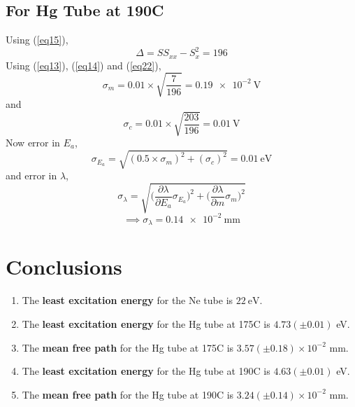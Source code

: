 \documentclass[%
 reprint,
 amsmath,amssymb,
 aps,
]{revtex4-2}
\begin{document}
    \subsection{For Hg Tube at 190\degree C}
        \noindent
        Using (\ref{eq15}),
        \begin{equation}
        \label{eq22}
            \Delta = S S_{xx} - S_{x}^2 = 196
        \end{equation}
        Using (\ref{eq13}), (\ref{eq14}) and (\ref{eq22}), 
        \begin{equation}
        \label{eq23}
            \sigma_m = 0.01 \times \sqrt{\dfrac{7}{196}} = \SI{0.19e-2}{\volt} 
        \end{equation}
        and
        \begin{equation}
        \label{eq24}
            \sigma_c = 0.01 \times \sqrt{\dfrac{203}{196}} = \SI{0.01}{\volt} 
        \end{equation}
        Now error in $E_a$,
        \begin{equation}
        \label{e25}
            \boxed{\sigma_{E_{a}} = \sqrt{(0.5 \times \sigma_m)^2 + (\sigma_c)^2} = \SI{0.01}{\electronvolt}}
        \end{equation}
        and error in $\lambda$, 
        \begin{equation}
        \label{eq26}
            \sigma_{\lambda} = \sqrt{\Bigg(\dfrac{\partial \lambda}{\partial E_a}\sigma_{E_{a}}\Bigg)^2 + \Bigg(\dfrac{\partial \lambda}{\partial m}\sigma_m\Bigg)^2}
        \end{equation}
        \begin{equation}
        \label{eq27}
            \implies \boxed{\sigma_{\lambda} = \SI{0.14e-2}{\milli \metre}}
        \end{equation}

\section{Conclusions}
\begin{enumerate}
    \item The \textbf{least excitation energy} for the Ne tube is $\SI{22}{\electronvolt}$.
    \item The \textbf{least excitation energy} for the Hg tube at 175\degree C is $4.73(\pm0.01)$ eV.
    \item The \textbf{mean free path} for the Hg tube at 175\degree C is $3.57(\pm 0.18) \times 10^{-2}$ mm.
    \item The \textbf{least excitation energy} for the Hg tube at 190\degree C is $4.63(\pm0.01)$ eV.
    \item The \textbf{mean free path} for the Hg tube at 190\degree C is $3.24(\pm 0.14) \times 10^{-2}$ mm.
\end{enumerate}



\nocite{*}

\end{document}
